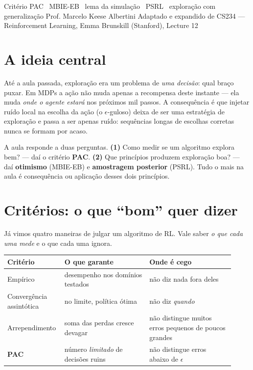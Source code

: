 \documentclass[11pt, a4paper]{article}
\begin{document}
     {Critério PAC \textbullet\ MBIE-EB \textbullet\ lema da simulação \textbullet\ PSRL
      \textbullet\ exploração com generalização}
     {Prof. Marcelo Keese Albertini}
     {Adaptado e expandido de CS234 — Reinforcement Learning, Emma Brunskill (Stanford), Lecture 12}

\section{A ideia central}

Até a aula passada, exploração era um problema de \emph{uma decisão}: qual braço puxar.
Em MDPs a ação não muda apenas a recompensa deste instante --- ela muda \emph{onde o
agente estará} nos próximos mil passos. A consequência é que injetar ruído local na
escolha da ação (o $\epsilon$-guloso) deixa de ser uma estratégia de exploração e passa
a ser apenas ruído: sequências longas de escolhas corretas nunca se formam por acaso.

\begin{ideiabox}
A aula responde a duas perguntas. \textbf{(1)} Como medir se um algoritmo explora bem?
--- daí o critério \textbf{PAC}. \textbf{(2)} Que princípios produzem exploração boa? ---
daí \textbf{otimismo} (MBIE-EB) e \textbf{amostragem posterior} (PSRL). Tudo o mais
na aula é consequência ou aplicação desses dois princípios.
\end{ideiabox}

\section{Critérios: o que ``bom'' quer dizer}

Já vimos quatro maneiras de julgar um algoritmo de RL. Vale saber \emph{o que cada uma
mede} e o que cada uma ignora.

\begin{center}\small
\begin{tabular}{@{}p{0.20\linewidth}p{0.36\linewidth}p{0.36\linewidth}@{}}
\toprule
\textbf{Critério} & \textbf{O que garante} & \textbf{Onde é cego} \\
\midrule
Empírico & desempenho nos domínios testados & não diz nada fora deles \\
Convergência assintótica & no limite, política ótima & não diz \emph{quando} \\
Arrependimento & soma das perdas cresce devagar & não distingue muitos erros pequenos de poucos grandes \\
\textbf{PAC} & número \emph{limitado} de decisões ruins & não distingue erros abaixo de $\epsilon$ \\
\bottomrule
\end{tabular}
\end{center}
\end{document}
